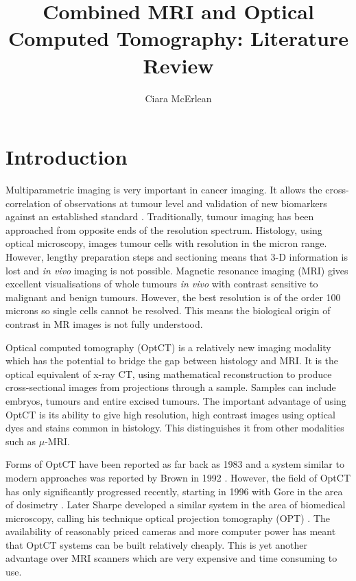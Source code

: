 \documentclass[12pt]{article}
\begin{document}
 
\title{Combined MRI and Optical Computed Tomography: Literature Review} 
\author{Ciara McErlean}
\maketitle 

\section{Introduction}
\label{sec:intro}

Multiparametric imaging is very important in cancer imaging. It allows the cross-correlation of observations at tumour level and  validation of new biomarkers against an established standard \cite{Padhani:2010hfa}. 
Traditionally, tumour imaging has been approached from opposite ends of the resolution spectrum. Histology, using optical microscopy,  images tumour cells with resolution in the micron range. However, lengthy preparation steps and sectioning means that 3-D information is lost and \textit{in vivo} imaging is not possible. Magnetic resonance imaging (MRI) gives excellent visualisations of whole tumours \textit{in vivo} with contrast sensitive to malignant and benign tumours. However, the best resolution is of the order 100 microns so single cells cannot be resolved. This means the biological origin of contrast in MR images is not fully understood. 

Optical computed tomography (OptCT) is a relatively new imaging modality which has the potential to bridge the gap between histology and MRI. It is the optical equivalent of x-ray CT, using mathematical reconstruction to produce cross-sectional images from projections through a sample. Samples can include embryos, tumours and entire excised tumours. The important advantage of using OptCT is its ability to give high resolution, high contrast images using optical dyes and stains common in histology. This distinguishes it from other modalities such as $\mu$-MRI.

Forms of OptCT have been reported as far back as 1983 \cite{ray1983laser,kawata1990laser} %
and a system similar to modern approaches was reported by Brown in 1992 \cite{Brown:1992}. 
However, the field of OptCT has only significantly  progressed recently, starting in 1996 with Gore in the area of dosimetry  \cite{Gore:1999tg}. Later Sharpe developed a similar system in the area of biomedical microscopy, calling his technique optical projection tomography (OPT)  \cite{Sharpe:2002jp}. The availability of reasonably priced cameras and more computer power has meant that OptCT systems can be built relatively cheaply. This is yet another advantage over MRI scanners which are very expensive and time consuming to use.
\end{document}
